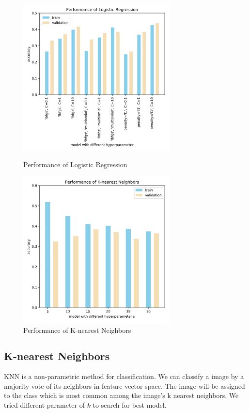 \documentclass[a4paper, 11pt]{article}
\begin{document}
\begin{figure}[!h]
\centering
\begin{minipage}[t]{0.48\textwidth}
\centering
\includegraphics[width=8cm]{image/lg.jpg}
\caption{\label{fig:lg}Performance of Logistic Regression}
\end{minipage}
\begin{minipage}[t]{0.48\textwidth}
\centering
\includegraphics[width=8cm]{image/knn.jpg}
\caption{\label{fig:knn}Performance of K-nearest Neighbors}
\end{minipage}
\end{figure}

\subsection*{K-nearest Neighbors}
KNN is a non-parametric method for classification. We can classify a image by a majority vote of its neighbors in feature vector space. The image will be assigned to the class which is most common among the image's k nearest neighbors. We tried different parameter of $k$ to search for best model.
\end{document}
